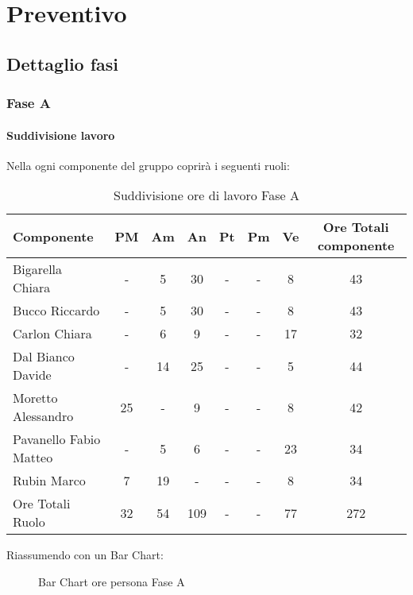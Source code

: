 \section{Preventivo}
	\subsection{Dettaglio fasi}
		\subsubsection{Fase A}
			\paragraph{Suddivisione lavoro}
				Nella  ogni componente del gruppo \groupname{} coprirà i seguenti ruoli:
				\begin{table}
					\begin{center}
						\begin{tabular}{| l | c | c | c | c | c | c | c |}
							\hline
							Componente 					& PM		& Am 		& An 		& Pt 		& Pm 		& Ve 		& Ore Totali componente \\ \hline
							
							Bigarella Chiara 			& - 		& 5 		& 30 		& - 		& - 		& 8 		& 43 \\
							Bucco Riccardo 				& - 		& 5 		& 30 		& - 		& -			& 8 		& 43 \\
							Carlon Chiara	 			& - 		& 6 		& 9 		& - 		& - 		& 17 		& 32 \\
							Dal Bianco Davide 			& - 		& 14 		& 25 		& - 		& - 		& 5 		& 44 \\
							Moretto Alessandro 			& 25 		& - 		& 9 		& - 		& - 		& 8 		& 42 \\
							Pavanello Fabio Matteo	 	& - 		& 5 		& 6 		& - 		& - 		& 23 		& 34 \\
							Rubin Marco					& 7 		& 19 		& - 		& - 		& - 		& 8 		& 34 \\ \hline \hline
							
							Ore Totali Ruolo 			& 32 		& 54 		& 109 		& - 		& - 		& 77 		& 272\\ \hline
						\end{tabular}
					\end{center}
					\caption{Suddivisione ore di lavoro Fase A}
				\end{table}
				Riassumendo con un Bar Chart:
				\begin{figure}\centering
					\caption{Bar Chart ore persona Fase A}
				\end{figure}
